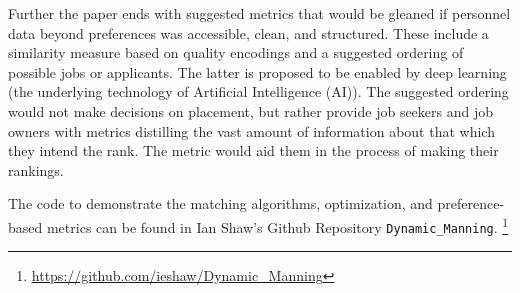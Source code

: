 Further the paper ends with suggested metrics that would be gleaned if personnel data beyond preferences was accessible, clean, and structured. These include a similarity measure based on quality encodings and a suggested ordering of possible jobs or applicants. The latter is proposed to be enabled by deep learning (the underlying technology of Artificial Intelligence (AI)). The suggested ordering would not make decisions on placement, but rather provide job seekers and job owners with metrics distilling the vast amount of information about that which they intend the rank. The metric would aid them in the process of making their rankings.

The code to demonstrate the matching algorithms, optimization, and preference-based metrics can be found in Ian Shaw's Github Repository \texttt{Dynamic\_Manning}. \footnote{\url{https://github.com/ieshaw/Dynamic_Manning}}
